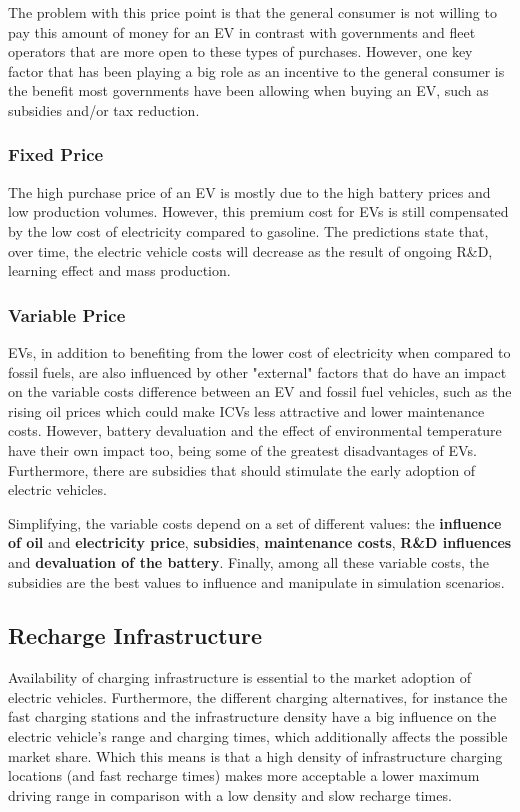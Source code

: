 The problem with this price point is that the general consumer is not willing to pay this amount of money for an EV in contrast with governments and fleet operators that are more open to these types of purchases. However, one key factor that has been playing a big role as an incentive to the general consumer is the benefit most governments have been allowing when buying an EV, such as subsidies and/or tax reduction.

\subsubsection{Fixed Price}
The high purchase price of an EV is mostly due to the high battery prices and low production volumes. However, this premium cost for EVs is still compensated by the low cost of electricity compared to gasoline. The predictions state that, over time, the electric vehicle costs will decrease as the result of ongoing R\&D, learning effect and mass production.

\subsubsection{Variable Price}
EVs, in addition to benefiting from the lower cost of electricity when compared to fossil fuels, are also influenced by other "external" factors that do have an impact on the variable costs difference between an EV and fossil fuel vehicles, such as the rising oil prices which could make ICVs less attractive and lower maintenance costs. However, battery devaluation and the effect of environmental temperature have their own impact too, being some of the greatest disadvantages of EVs. Furthermore, there are subsidies that should stimulate the early adoption of electric vehicles.

Simplifying, the variable costs depend on a set of different values: the \textbf{influence of oil} and \textbf{electricity price}, \textbf{subsidies}, \textbf{maintenance costs}, \textbf{R\&D influences} and \textbf{devaluation of the battery}. Finally, among all these variable costs, the subsidies are the best values to influence and manipulate in simulation scenarios.

\subsection{Recharge Infrastructure}
Availability of charging infrastructure is essential to the market adoption of electric vehicles. Furthermore, the different charging alternatives, for instance the fast charging stations and the infrastructure density have a big influence on the electric vehicle's range and charging times, which additionally affects the possible market share. Which this means is that a high density of infrastructure charging locations (and fast recharge times) makes more acceptable a lower maximum driving range in comparison with a low density and slow recharge times.

